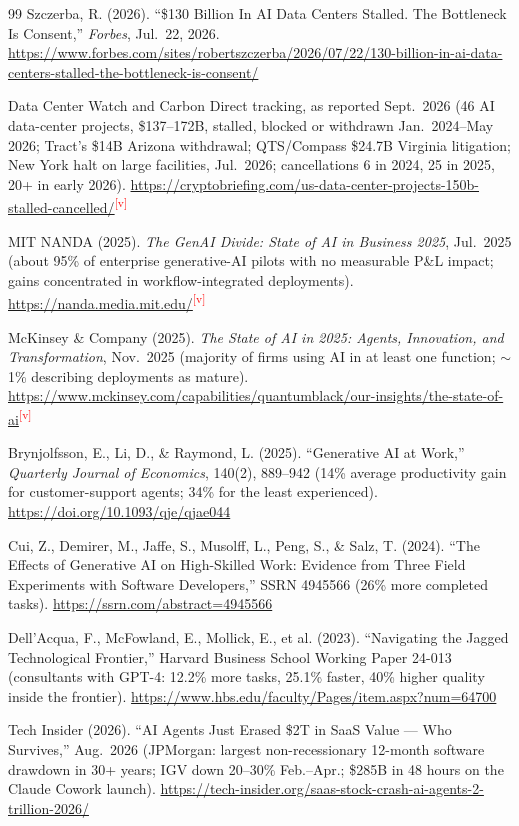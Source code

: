 \documentclass[11pt,letterpaper]{article}
\newcommand{\verify}{\textsuperscript{\textcolor{red}{[v]}}}
\begin{document}
\begin{thebibliography}{99}
Szczerba, R. (2026). ``\$130 Billion In AI Data Centers Stalled. The Bottleneck Is Consent,'' \textit{Forbes}, Jul.~22, 2026. \url{https://www.forbes.com/sites/robertszczerba/2026/07/22/130-billion-in-ai-data-centers-stalled-the-bottleneck-is-consent/}

Data Center Watch and Carbon Direct tracking, as reported Sept.~2026 (46 AI data-center projects, \$137--172B, stalled, blocked or withdrawn Jan.~2024--May 2026; Tract's \$14B Arizona withdrawal; QTS/Compass \$24.7B Virginia litigation; New York halt on large facilities, Jul.~2026; cancellations 6 in 2024, 25 in 2025, 20+ in early 2026). \url{https://cryptobriefing.com/us-data-center-projects-150b-stalled-cancelled/}\verify

MIT NANDA (2025). \textit{The GenAI Divide: State of AI in Business 2025}, Jul.~2025 (about 95\% of enterprise generative-AI pilots with no measurable P\&L impact; gains concentrated in workflow-integrated deployments). \url{https://nanda.media.mit.edu/}\verify

McKinsey \& Company (2025). \textit{The State of AI in 2025: Agents, Innovation, and Transformation}, Nov.~2025 (majority of firms using AI in at least one function; $\sim$1\% describing deployments as mature). \url{https://www.mckinsey.com/capabilities/quantumblack/our-insights/the-state-of-ai}\verify

Brynjolfsson, E., Li, D., \& Raymond, L. (2025). ``Generative AI at Work,'' \textit{Quarterly Journal of Economics}, 140(2), 889--942 (14\% average productivity gain for customer-support agents; 34\% for the least experienced). \url{https://doi.org/10.1093/qje/qjae044}

Cui, Z., Demirer, M., Jaffe, S., Musolff, L., Peng, S., \& Salz, T. (2024). ``The Effects of Generative AI on High-Skilled Work: Evidence from Three Field Experiments with Software Developers,'' SSRN 4945566 (26\% more completed tasks). \url{https://ssrn.com/abstract=4945566}

Dell'Acqua, F., McFowland, E., Mollick, E., et al. (2023). ``Navigating the Jagged Technological Frontier,'' Harvard Business School Working Paper 24-013 (consultants with GPT-4: 12.2\% more tasks, 25.1\% faster, 40\% higher quality inside the frontier). \url{https://www.hbs.edu/faculty/Pages/item.aspx?num=64700}

Tech Insider (2026). ``AI Agents Just Erased \$2T in SaaS Value --- Who Survives,'' Aug.~2026 (JPMorgan: largest non-recessionary 12-month software drawdown in 30+ years; IGV down 20--30\% Feb.--Apr.; \$285B in 48 hours on the Claude Cowork launch). \url{https://tech-insider.org/saas-stock-crash-ai-agents-2-trillion-2026/}


\end{thebibliography}
\end{document}
